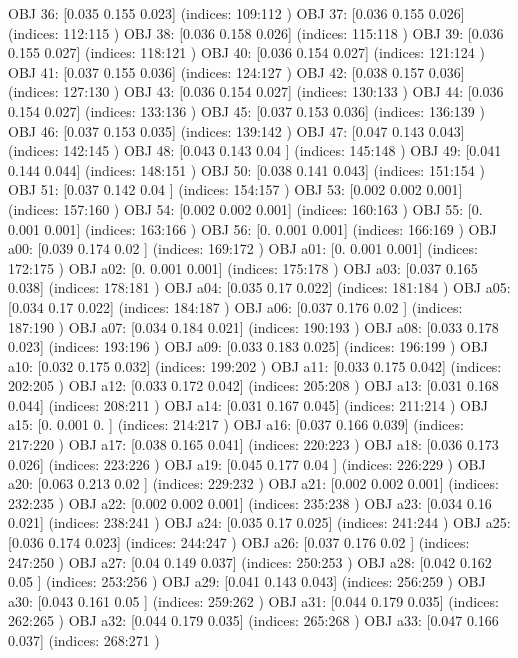 OBJ 36: [0.035 0.155 0.023] (indices: 109:112 )
OBJ 37: [0.036 0.155 0.026] (indices: 112:115 )
OBJ 38: [0.036 0.158 0.026] (indices: 115:118 )
OBJ 39: [0.036 0.155 0.027] (indices: 118:121 )
OBJ 40: [0.036 0.154 0.027] (indices: 121:124 )
OBJ 41: [0.037 0.155 0.036] (indices: 124:127 )
OBJ 42: [0.038 0.157 0.036] (indices: 127:130 )
OBJ 43: [0.036 0.154 0.027] (indices: 130:133 )
OBJ 44: [0.036 0.154 0.027] (indices: 133:136 )
OBJ 45: [0.037 0.153 0.036] (indices: 136:139 )
OBJ 46: [0.037 0.153 0.035] (indices: 139:142 )
OBJ 47: [0.047 0.143 0.043] (indices: 142:145 )
OBJ 48: [0.043 0.143 0.04 ] (indices: 145:148 )
OBJ 49: [0.041 0.144 0.044] (indices: 148:151 )
OBJ 50: [0.038 0.141 0.043] (indices: 151:154 )
OBJ 51: [0.037 0.142 0.04 ] (indices: 154:157 )
OBJ 53: [0.002 0.002 0.001] (indices: 157:160 )
OBJ 54: [0.002 0.002 0.001] (indices: 160:163 )
OBJ 55: [0.    0.001 0.001] (indices: 163:166 )
OBJ 56: [0.    0.001 0.001] (indices: 166:169 )
OBJ a00: [0.039 0.174 0.02 ] (indices: 169:172 )
OBJ a01: [0.    0.001 0.001] (indices: 172:175 )
OBJ a02: [0.    0.001 0.001] (indices: 175:178 )
OBJ a03: [0.037 0.165 0.038] (indices: 178:181 )
OBJ a04: [0.035 0.17  0.022] (indices: 181:184 )
OBJ a05: [0.034 0.17  0.022] (indices: 184:187 )
OBJ a06: [0.037 0.176 0.02 ] (indices: 187:190 )
OBJ a07: [0.034 0.184 0.021] (indices: 190:193 )
OBJ a08: [0.033 0.178 0.023] (indices: 193:196 )
OBJ a09: [0.033 0.183 0.025] (indices: 196:199 )
OBJ a10: [0.032 0.175 0.032] (indices: 199:202 )
OBJ a11: [0.033 0.175 0.042] (indices: 202:205 )
OBJ a12: [0.033 0.172 0.042] (indices: 205:208 )
OBJ a13: [0.031 0.168 0.044] (indices: 208:211 )
OBJ a14: [0.031 0.167 0.045] (indices: 211:214 )
OBJ a15: [0.    0.001 0.   ] (indices: 214:217 )
OBJ a16: [0.037 0.166 0.039] (indices: 217:220 )
OBJ a17: [0.038 0.165 0.041] (indices: 220:223 )
OBJ a18: [0.036 0.173 0.026] (indices: 223:226 )
OBJ a19: [0.045 0.177 0.04 ] (indices: 226:229 )
OBJ a20: [0.063 0.213 0.02 ] (indices: 229:232 )
OBJ a21: [0.002 0.002 0.001] (indices: 232:235 )
OBJ a22: [0.002 0.002 0.001] (indices: 235:238 )
OBJ a23: [0.034 0.16  0.021] (indices: 238:241 )
OBJ a24: [0.035 0.17  0.025] (indices: 241:244 )
OBJ a25: [0.036 0.174 0.023] (indices: 244:247 )
OBJ a26: [0.037 0.176 0.02 ] (indices: 247:250 )
OBJ a27: [0.04  0.149 0.037] (indices: 250:253 )
OBJ a28: [0.042 0.162 0.05 ] (indices: 253:256 )
OBJ a29: [0.041 0.143 0.043] (indices: 256:259 )
OBJ a30: [0.043 0.161 0.05 ] (indices: 259:262 )
OBJ a31: [0.044 0.179 0.035] (indices: 262:265 )
OBJ a32: [0.044 0.179 0.035] (indices: 265:268 )
OBJ a33: [0.047 0.166 0.037] (indices: 268:271 )
